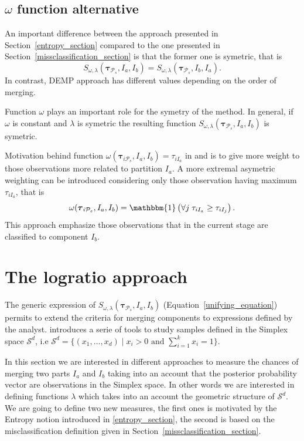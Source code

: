 \documentclass[10pt, a4paper]{article}
\theoremstyle{definition}
\newcommand{\m}[1]{\boldsymbol{#1}}
\begin{document}
\begin{spacing}{1.9}
\subsection{$\omega$ function alternative}


An important difference between the approach presented in Section~\ref{entropy_section} \citep{baudry2010combining} compared to the one presented in Section~\ref{missclassification_section} \citep{hennig2010methods} is that the former one is symetric, that is
\[
S_{\omega, \lambda}( \m\tau_{\mathcal{P}_s},  I_a,  I_b) = S_{\omega, \lambda}( \m\tau_{\mathcal{P}_s},  I_b,  I_a).
\]
In contrast, DEMP approach has different values depending on the order of merging.

Function $\omega$ plays an important role for the symetry of the method. In general, if $\omega$ is constant and $\lambda$ is symetric the resulting function $S_{\omega, \lambda}( \m\tau_{\mathcal{P}_s},  I_a,  I_b)$ is symetric.

Motivation behind function $\omega(\m\tau_{i \mathcal{P}_s},  I_a,  I_b) = \tau_{iI_a}$ in \cite{hennig2010methods} and \cite{longford2014}  is to give more weight to those observations more related to partition $I_a$. A more extremal asymetric weighting can be introduced considering only those observation having maximum $ \tau_{iI_a}$, that is
\[
\omega(\m\tau_{i \mathcal{P}_s},  I_a,  I_b) = \mathbbm{1}\left( \forall j\; \tau_{i I_{a}} \geq \tau_{iI_j} \right).
\]
This approach emphasize those observations that in the current stage are classified to component $I_b$.


\section{The logratio approach}\label{logratio_section}

The generic expression of $S_{\omega, \lambda}( \m\tau_{\mathcal{P}_s},  I_a,  I_b)$ (Equation~\ref{unifying_equation}) permits to extend the criteria for merging components to expressions defined by the analyst. \cite{aitchison1986statistical} introduces a serie of tools to study samples defined in the Simplex space $\mathcal{S}^d$, i.e $\mathcal{S}^d = \{ (x_1,\dots, x_d) \;|\; x_i > 0 \text{ and } \sum_{i=1}^k x_i = 1 \}$. 

In this section we are interested in different approaches to measure the chances of merging two parts $I_a$ and $I_b$ taking into an account that the posterior probability vector are observations in the Simplex space. In other words we are interested in defining functions $\lambda$ which takes into an account the geometric structure of $\mathcal{S}^d$. We are going to define two new measures, the first ones is motivated by the Entropy notion introduced in \ref{entropy_section}, the second is based on the misclassification definition given in Section~\ref{missclassification_section}.



\end{spacing}
\end{document}
